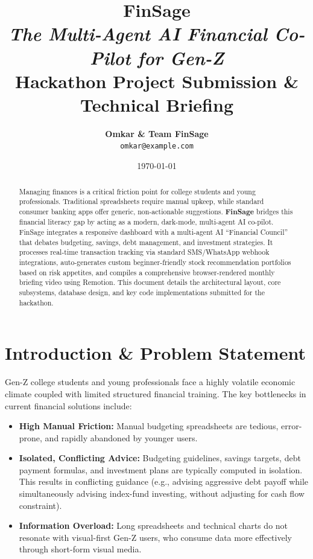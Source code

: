 \documentclass[11pt,a4paper]{article}
\title{
    \vspace{-2cm}
    {\color{brandPurple}\Huge\textbf{FinSage}} \\
    \vspace{0.3cm}
    \large \textit{The Multi-Agent AI Financial Co-Pilot for Gen-Z} \\
    \vspace{0.8cm}
    \Large \textbf{Hackathon Project Submission \& Technical Briefing}
    \vspace{1cm}
}
\author{
    \textbf{Omkar \& Team FinSage} \\
    \texttt{omkar@example.com} %
}
\date{\today}
\begin{document}
\maketitle

\begin{abstract}
Managing finances is a critical friction point for college students and young professionals. Traditional spreadsheets require manual upkeep, while standard consumer banking apps offer generic, non-actionable suggestions. \textbf{FinSage} bridges this financial literacy gap by acting as a modern, dark-mode, multi-agent AI co-pilot. FinSage integrates a responsive dashboard with a multi-agent AI ``Financial Council'' that debates budgeting, savings, debt management, and investment strategies. It processes real-time transaction tracking via standard SMS/WhatsApp webhook integrations, auto-generates custom beginner-friendly stock recommendation portfolios based on risk appetites, and compiles a comprehensive browser-rendered monthly briefing video using Remotion. This document details the architectural layout, core subsystems, database design, and key code implementations submitted for the hackathon.
\end{abstract}

\newpage
\tableofcontents
\newpage

\section{Introduction \& Problem Statement}
Gen-Z college students and young professionals face a highly volatile economic climate coupled with limited structured financial training. The key bottlenecks in current financial solutions include:
\begin{itemize}
    \item \textbf{High Manual Friction:} Manual budgeting spreadsheets are tedious, error-prone, and rapidly abandoned by younger users.
    \item \textbf{Isolated, Conflicting Advice:} Budgeting guidelines, savings targets, debt payment formulas, and investment plans are typically computed in isolation. This results in conflicting guidance (e.g., advising aggressive debt payoff while simultaneously advising index-fund investing, without adjusting for cash flow constraint).
    \item \textbf{Information Overload:} Long spreadsheets and technical charts do not resonate with visual-first Gen-Z users, who consume data more effectively through short-form visual media.
\end{itemize}
\end{document}
